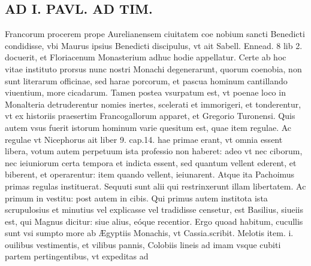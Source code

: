 \documentclass{article}
\begin{document}
\begin{pages}
\section*{AD I. PAVL. AD TIM. }
\marginpar{[ p.220 ]}\pstart Francorum procerem prope Aurelianensem ciuitatem coe nobium sancti Benedicti condidisse, vbi Maurus ipsius Benedicti discipulus, vt ait Sabell. Ennead. 8 lib 2. docuerit, et Floriacenum Monasterium adhuc hodie appellatur. Certe ab hoc vitae instituto prorsus nunc nostri Monachi degenerarunt, quorum coenobia, non sunt literarum officinae, sed harae porcorum, et pascua hominum cantillando viuentium, more cicadarum. Tamen postea vsurpatum est, vt poenae loco in Monalteria detruderentur nomies inertes, scelerati et immorigeri, et tonderentur, vt ex historiis praesertim Francogallorum apparet, et Gregorio Turonensi.  \pend\pstart Quis autem vsus fuerit istorum hominum varie quesitum est, quae item regulae.  \pend\pstart Ac regulae vt Nicephorus ait liber 9. cap.14. hae primae erant, vt omnia essent libera, votum autem perpetuum ista professio non haberet: adeo vt nec ciborum, nec ieiuniorum certa tempora et indicta essent, sed quantum vellent ederent, et biberent, et operarentur: item quando vellent, ieiunarent. Atque ita Pachoimus primas regulas instituerat. Sequuti sunt alii qui restrinxerunt illam libertatem. Ac primum in vestitu: post autem in cibis. Qui primus autem institota ista scrupulosius et minutius vel explicasse vel tradidisse censetur, est Basilius, siueiis est, qui Magnus dicitur: siue alius, eóque recentior. Ergo quoad habitum, cucullis sunt vsi sumpto more ab Ægyptiis Monachis, vt Cassia.scribit. Melotis item. i. ouilibus vestimentis, et vilibus pannis, Colobiis lineis ad imam vsque cubiti partem pertingentibus, vt expeditas ad  \pend

\end{pages}
\end{document}
